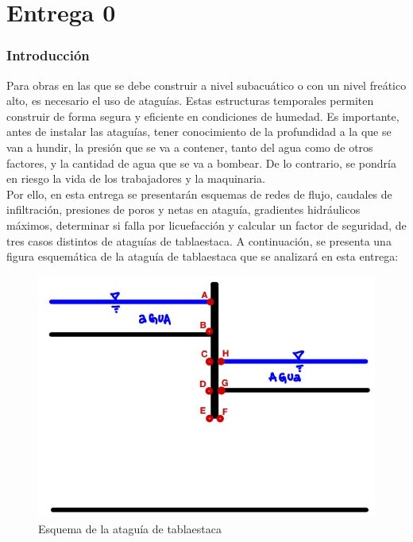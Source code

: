 \documentclass{article}
\begin{document}
\part{Entrega 0}
\section{Introducción}
Para obras en las que se debe construir a nivel subacuático o con un nivel freático alto, es necesario el uso de ataguías. Estas estructuras temporales permiten construir de forma segura y eficiente en condiciones de humedad. Es importante, antes de instalar las ataguías, tener conocimiento de la profundidad a la que se van a hundir, la presión que se va a contener, tanto del agua como de otros factores, y la cantidad de agua que se va a bombear. De lo contrario, se pondría en riesgo la vida de los trabajadores y la maquinaria. \\

Por ello, en esta entrega se presentarán esquemas de redes de flujo, caudales de infiltración, presiones de poros y netas en ataguía, gradientes hidráulicos máximos, determinar si falla por licuefacción y calcular un factor de seguridad, de tres casos distintos de ataguías de tablaestaca. A continuación, se presenta una figura esquemática de la ataguía de tablaestaca que se analizará en esta entrega:

\begin{figure}[h!]
  \centering
  \includegraphics[width=0.8\linewidth]{graficos/puntos_interes.png}
  \caption{Esquema de la ataguía de tablaestaca}
  \label{fig:enunciado}
\end{figure}




\newpage
\end{document}
